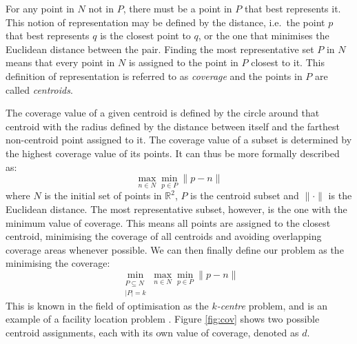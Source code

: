 For any point in $N$ not in $P$, there must be a point in $P$ that best represents it. This notion of representation may be defined by the distance, i.e.\ the point $p$ that best represents $q$ is the closest point to $q$, or the one that minimises the Euclidean distance between the pair.
Finding the most representative set $P$ in $N$ means that every point in $N$ is assigned to the point in $P$ closest to it. This definition of representation is referred to as \emph{coverage} and the points in $P$ are called \emph{centroids}.

The coverage value of a given centroid is defined by the circle around that centroid with the radius defined by the distance between itself and the farthest non-centroid point assigned to it. The coverage value of a subset is determined by the highest coverage value of its points. It can thus be more formally described as:
\begin{equation}
\max_{n \in N}
	{\min_{p \in P}
		{\lVert p-n \rVert}
	}
\end{equation}
where $N$ is the initial set of points in $\mathbb{R}^2$, $P$ is the centroid subset and $\lVert \cdot \rVert $ is the Euclidean distance.
The most representative subset, however, is the one with the minimum value of coverage. This means all points are assigned to the closest centroid, minimising the coverage of all centroids and avoiding overlapping coverage areas whenever possible.
We can then finally define our problem as the minimising the coverage:
\begin{equation}
\min_{\substack{P \subseteq N\\ \lvert P \rvert = k}}{\max_{n \in N}{\min_{p \in P}{\lVert p-n \rVert}}}
\end{equation}
This is known in the field of optimisation as the \emph{$k$-centre} problem, and is an example of a facility location problem \cite{thisfref}. Figure \ref{fig:cov} shows two possible centroid assignments, each with its own value of coverage, denoted as $d$.



